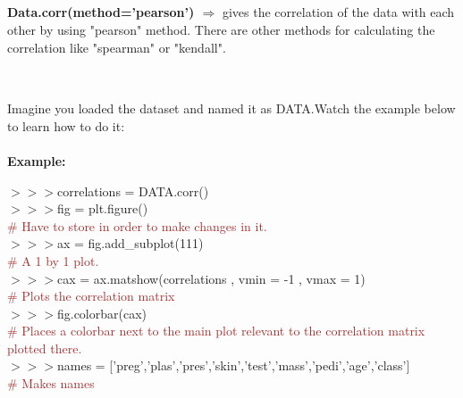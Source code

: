 \documentclass[a4paper,18pt]{article}
\begin{document}

\subsection{\colorbox {matgreen}{\color{white}{\large Data.corr(method='pearson')}}}
\textbf{ Data.corr(method='pearson') $\Rightarrow$} gives the correlation of the data with each other by using "pearson" method. There are other methods for calculating the correlation like "spearman" or "kendall". \\\\


\subsection{\colorbox {matgreen}{\color{white}{\large Plotting Correlation Graph}}}
Imagine you loaded the dataset and named it as DATA.Watch the example below to learn how to do it:\\\\
\textbf{Example:\\}

$>>>$correlations = DATA.corr()\\

$>>>$fig = plt.figure()\\{\textcolor{brown}{\# Have to store in order to make changes in it.}}\\

$>>>$ax = fig.add\_subplot(111)\\{\textcolor{brown}{\# A 1 by 1 plot. }}\\

$>>>$cax = ax.matshow(correlations , vmin = -1 , vmax = 1)\\{\textcolor{brown}{\# Plots the correlation matrix}}\\

$>>>$fig.colorbar(cax)\\{\textcolor{brown}{\# Places a colorbar next to the main plot relevant to the correlation matrix plotted there.}}\\

$>>>$names = ['preg','plas','pres','skin','test','mass','pedi','age','class']\\{\textcolor{brown}{\# Makes names}}\\
\end{document}
